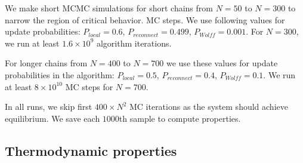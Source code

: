 We make short MCMC simulations for short chains from $N=50$ to $N=300$ to narrow the region of critical behavior. MC steps. We use following values for update probabilities: $P_{local}=0.6$, $P_{reconnect}=0.499$, $P_{Wolff}=0.001$. For $N=300$, we run at least $1.6 \times  10^{9} $ algorithm iterations.

For longer chains from $N=400$ to $N=700$ we use these values for update probabilities in the algorithm: $P_{local}=0.5$, $P_{reconnect}=0.4$, $P_{Wolff}=0.1$. We run at least $ 8 \times 10^{10}$ MC steps for $N=700$.

In all runs, we skip first $ 400 \times N^2$ MC iterations as the system should achieve equilibrium. We save each $1000$th sample to compute properties. 

\subsection{Thermodynamic properties}

